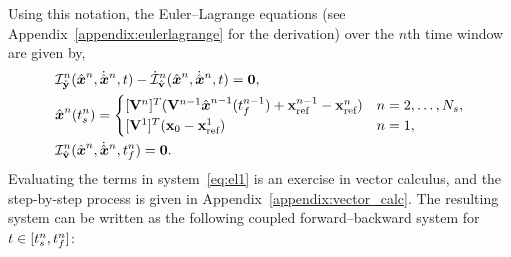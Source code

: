 Using this notation, the Euler--Lagrange equations (see
Appendix~\ref{appendix:eulerlagrange} for the derivation) over the $n$th
time window are given by, 
\begin{equation}\label{eq:el1} 
\begin{split}
& \dIdYArg{n}(\genstateArgnt{n},\genstateDotArgnt{n},t) - \dIdVDotArg{n}(\genstateArgnt{n},\genstateDotArgnt{n}, t )  = \bz, \\ 
&\genstate^n(\timeStartArg{n})  = \begin{cases} 
\spatialIC &
n=2,\ldots,\nslabs, \\ 
\genstateICOne & n=1,
\end{cases}\\ 
&\dIdVArg{n}(\genstateArgnt{n},\genstateDotArgnt{n},\timeEndArg{n})  = \bz.
\end{split} 
\end{equation}
Evaluating the terms in system~\eqref{eq:el1} is an exercise in
vector calculus, and the step-by-step process is given in
Appendix~\ref{appendix:vector_calc}. The resulting system can be written as the 
following coupled forward--backward system for $t \in
[t_s^{n},t_f^{n} ]$:
